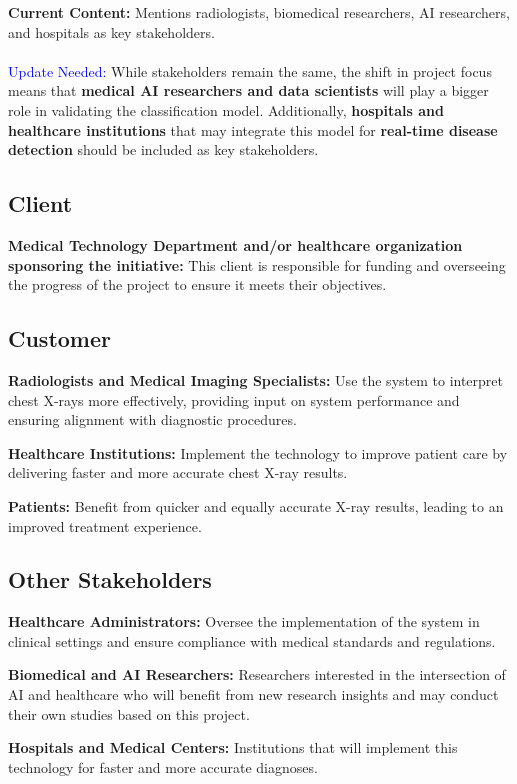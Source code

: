 \documentclass[12pt]{article}
\begin{document}
\textbf{Current Content:} Mentions radiologists, biomedical researchers, AI researchers, and hospitals as key stakeholders. \\
\\
{\textcolor{blue}{Update Needed:}} While stakeholders remain the same, the shift in project focus means that \textbf{medical AI researchers and data scientists} will play a bigger role in validating the classification model. Additionally, \textbf{hospitals and healthcare institutions} that may integrate this model for \textbf{real-time disease detection} should be included as key stakeholders.\\

\subsection{Client}
\textbf{Medical Technology Department and/or healthcare organization sponsoring the initiative: }
This client is responsible for funding and overseeing the progress of the project to ensure it 
meets their objectives.

\subsection{Customer}
\textbf{Radiologists and Medical Imaging Specialists: } Use the system to interpret chest X-rays 
more effectively, providing input on system performance and ensuring alignment with diagnostic 
procedures.

\textbf{Healthcare Institutions: } Implement the technology to improve patient care by delivering 
faster and more accurate chest X-ray results.

\textbf{Patients: } Benefit from quicker and equally accurate X-ray results, leading to an 
improved treatment experience.

\subsection{Other Stakeholders}
\textbf{Healthcare Administrators: } Oversee the implementation of the system in clinical settings 
and ensure compliance with medical standards and regulations.

\textbf{Biomedical and AI Researchers: } Researchers interested in the intersection of AI and 
healthcare who will benefit from new research insights and may conduct their own studies based on 
this project.

\textbf{Hospitals and Medical Centers:} Institutions that will implement this technology for 
faster and more accurate diagnoses.
\end{document}
